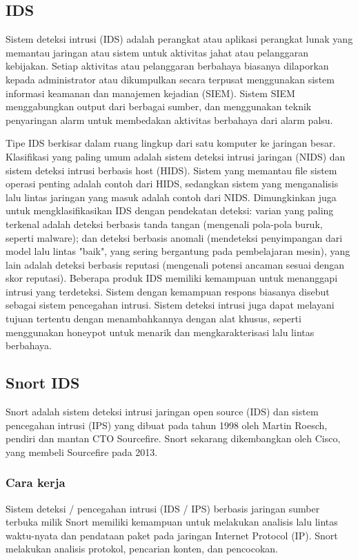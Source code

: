 \documentclass[./skripsi.tex]{subfiles}
\begin{document}
\subsection{IDS}
\par Sistem deteksi intrusi (IDS) adalah perangkat atau aplikasi perangkat lunak yang memantau jaringan atau sistem untuk aktivitas jahat atau pelanggaran kebijakan. Setiap aktivitas atau pelanggaran berbahaya biasanya dilaporkan kepada administrator atau dikumpulkan secara terpusat menggunakan sistem informasi keamanan dan manajemen kejadian (SIEM). Sistem SIEM menggabungkan output dari berbagai sumber, dan menggunakan teknik penyaringan alarm untuk membedakan aktivitas berbahaya dari alarm palsu. \cite{martellini2017cyber}
\par Tipe IDS berkisar dalam ruang lingkup dari satu komputer ke jaringan besar. \cite{axelsson2000intrusion} Klasifikasi yang paling umum adalah sistem deteksi intrusi jaringan (NIDS) dan sistem deteksi intrusi berbasis host (HIDS). Sistem yang memantau file sistem operasi penting adalah contoh dari HIDS, sedangkan sistem yang menganalisis lalu lintas jaringan yang masuk adalah contoh dari NIDS. Dimungkinkan juga untuk mengklasifikasikan IDS dengan pendekatan deteksi: varian yang paling terkenal adalah deteksi berbasis tanda tangan (mengenali pola-pola buruk, seperti malware); dan deteksi berbasis anomali (mendeteksi penyimpangan dari model lalu lintas "baik", yang sering bergantung pada pembelajaran mesin), yang lain adalah deteksi berbasis reputasi (mengenali potensi ancaman sesuai dengan skor reputasi). Beberapa produk IDS memiliki kemampuan untuk menanggapi intrusi yang terdeteksi. Sistem dengan kemampuan respons biasanya disebut sebagai sistem pencegahan intrusi. \cite{newman2009computer} Sistem deteksi intrusi juga dapat melayani tujuan tertentu dengan menambahkannya dengan alat khusus, seperti menggunakan honeypot untuk menarik dan mengkarakterisasi lalu lintas berbahaya.
\cite{liao2013intrusion}
\subsection{Snort IDS}
Snort adalah sistem deteksi intrusi jaringan open source (IDS) dan sistem pencegahan intrusi (IPS) \cite{carr2007snort} yang dibuat pada tahun 1998 oleh Martin Roesch, pendiri dan mantan CTO Sourcefire. \cite{greenemeier2006sourcefire} Snort sekarang dikembangkan oleh Cisco, yang membeli Sourcefire pada 2013.
\subsubsection{Cara kerja}
Sistem deteksi / pencegahan intrusi (IDS / IPS) berbasis jaringan sumber terbuka milik Snort memiliki kemampuan untuk melakukan analisis lalu lintas waktu-nyata dan pendataan paket pada jaringan Internet Protocol (IP). Snort melakukan analisis protokol, pencarian konten, dan pencocokan.
\end{document}
